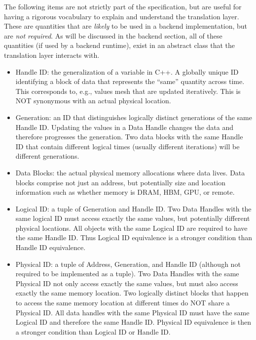 The following items are not strictly part of the specification, but are useful for having a rigorous vocabulary to explain and understand the translation layer.
These are quantities that are \emph{likely} to be used in a backend implementation, but are \emph{not required}.
As will be discussed in the backend section, all of these quantities (if used by a backend runtime),
exist in an abstract class  that the translation layer interacts with.
\begin{itemize}
\item Handle ID: the generalization of a variable in C++. A globally unique ID identifying a block of data that represents the ``same'' quantity across time.  
This corresponds to, e.g., values mesh that are updated iteratively.  
This is NOT synonymous with an actual physical location.
\item Generation: an ID that distinguishes logically distinct generations of the same Handle ID. 
Updating the values in a Data Handle changes the data and therefore progresses the generation. 
Two data blocks with the same Handle ID that contain different logical times (usually different iterations) will be different generations.
\item Data Blocks: the actual physical memory allocations where data lives. 
Data blocks comprise not just an address, but potentially size and location information such as whether memory is DRAM, HBM, GPU, or remote.
\item Logical ID: a tuple of Generation and Handle ID. 
Two Data Handles with the same logical ID must access exactly the same values, but potentially different physical locations. 
All objects with the same Logical ID are required to have the same Handle ID.
Thus Logical ID equivalence is a stronger condition than Handle ID equivalence.
\item Physical ID: a tuple of Address, Generation, and Handle ID (although not required to be implemented as a tuple). 
Two Data Handles with the same Physical ID not only access exactly the same values, but must also access exactly the same memory location. 
Two logically distinct blocks that happen to access the same memory location at different times do NOT share a Physical ID. 
All data handles with the same Physical ID must have the same Logical ID and therefore the same Handle ID. 
Physical ID equivalence is then a stronger condition than Logical ID or Handle ID.
\end{itemize}

